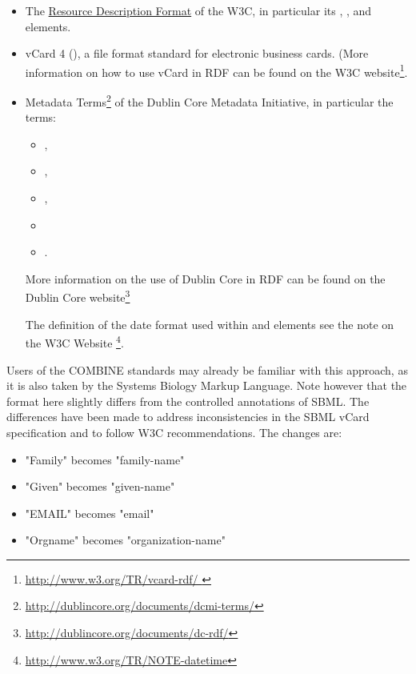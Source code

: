 \begin{itemize}
	\item  {
	
     The \href{http://www.w3.org/RDF/ }{ Resource Description Format} of the 
     W3C, in particular its , ,  and 
      elements. 

	}
	\item  {

	vCard 4 (\cite{rfc6350}), a file format standard for electronic business 
    cards. (More information on how to use vCard in RDF can be found 
    on the W3C website\footnote[1]{\url{http://www.w3.org/TR/vcard-rdf/ }}. 

	}
	\item {
	
	Metadata 
	Terms\footnote[2]{\url{http://dublincore.org/documents/dcmi-terms/}} of 
	the Dublin Core Metadata Initiative, in particular the terms: 

	\begin{itemize}
		\item {}, 
		\item {}, 
		\item {}, 
		\item {}
		\item {}.
	\end{itemize}
		
	More information on the use of Dublin Core in RDF can be found 
	on the Dublin Core website{\footnote[3]{\url{http://dublincore.org/documents/dc-rdf/}}} } 
	
	The definition of the date format used within  and 
	 elements see the note on the W3C Website 
	{\footnote[4]{\url{http://www.w3.org/TR/NOTE-datetime}}}.

\end{itemize}
\pagebreak
Users of the COMBINE standards may already be familiar with this 
approach, as it is also taken by the Systems Biology Markup Language. 
Note however that the format here slightly differs from the controlled 
annotations of SBML. The differences have been made to address inconsistencies 
in the SBML vCard specification and to follow W3C recommendations. The changes 
are:

\begin{itemize}
	\item  "Family" becomes "family-name" 
	\item  "Given" becomes "given-name" 
	\item  "EMAIL" becomes "email" 
	\item  "Orgname" becomes "organization-name" 
\end{itemize}

